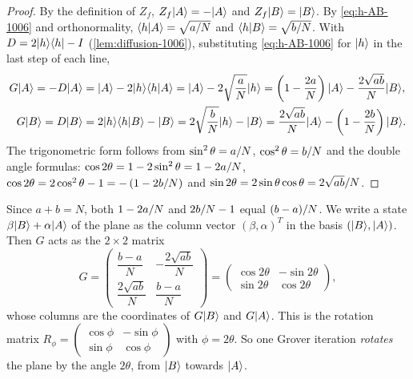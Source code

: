 \begin{proof}
    By the definition of $Z_f$, $Z_f\lvert A \rangle = -\lvert A \rangle$ and $Z_f\lvert B \rangle = \lvert B \rangle$. By
    \cref{eq:h-AB-1006} and orthonormality, $\langle h \vert A \rangle = \sqrt{a/N}$ and
    $\langle h \vert B \rangle = \sqrt{b/N}$. With $D = 2\lvert h \rangle\langle h \rvert - I$ (\cref{lem:diffusion-1006}),
    substituting \cref{eq:h-AB-1006} for $\lvert h \rangle$ in the last step of each line,
    \begin{align*}
        G\lvert A \rangle = -D\lvert A \rangle & = \lvert A \rangle - 2\lvert h \rangle\langle h \vert A \rangle = \lvert A \rangle - 2\sqrt{\frac{a}{N}} \lvert h \rangle
        = \left(1 - \frac{2a}{N}\right)\lvert A \rangle - \frac{2\sqrt{ab}}{N}\lvert B \rangle, \\
        G\lvert B \rangle = D\lvert B \rangle  & = 2\lvert h \rangle\langle h \vert B \rangle - \lvert B \rangle = 2\sqrt{\frac{b}{N}} \lvert h \rangle - \lvert B \rangle
        = \frac{2\sqrt{ab}}{N}\lvert A \rangle - \left(1 - \frac{2b}{N}\right)\lvert B \rangle.
    \end{align*}
    The trigonometric form follows from $\sin^2\theta = a/N$, $\cos^2\theta = b/N$ and
    the double angle formulas: $\cos 2\theta = 1 - 2\sin^2\theta = 1 - 2a/N$,
    $\cos 2\theta = 2\cos^2\theta - 1 = -\left(1 - 2b/N\right)$ and
    $\sin 2\theta = 2\sin\theta\cos\theta = 2\sqrt{ab}/N$.
\end{proof}

Since $a + b = N$, both $1 - 2a/N$ and $2b/N - 1$ equal $(b - a)/N$. We write a
state $\beta\lvert B \rangle + \alpha\lvert A \rangle$ of the plane as the column vector $(\beta, \alpha)^{T}$ in the basis
$(\lvert B \rangle, \lvert A \rangle)$. Then $G$ acts as the $2 \times 2$ matrix
\begin{equation}\label{eq:gmatrix-1006}
    G = \begin{pmatrix} \dfrac{b - a}{N} & -\dfrac{2\sqrt{ab}}{N} \\[2ex] \dfrac{2\sqrt{ab}}{N} & \dfrac{b - a}{N} \end{pmatrix}
    = \begin{pmatrix} \cos 2\theta & -\sin 2\theta \\ \sin 2\theta & \cos 2\theta \end{pmatrix},
\end{equation}
whose columns are the coordinates of $G\lvert B \rangle$ and $G\lvert A \rangle$. This is the rotation matrix
$R_{\phi} = \left(\begin{smallmatrix} \cos\phi & -\sin\phi \\ \sin\phi & \cos\phi \end{smallmatrix}\right)$
with $\phi = 2\theta$. So one Grover iteration \emph{rotates} the plane by the angle $2\theta$, from
$\lvert B \rangle$ towards $\lvert A \rangle$.

